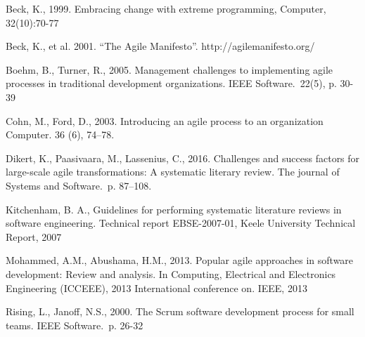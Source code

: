 \renewcommand{\baselinestretch}{1.0}
\setlength{\parskip}{0.5em}

Beck, K., 1999. Embracing change with extreme programming, Computer,
32(10):70-77

Beck, K., et al. 2001. ``The Agile Manifesto''.
http://agilemanifesto.org/

Boehm, B., Turner, R., 2005. Management challenges to implementing agile
processes in traditional development organizations. IEEE Software.\ 22(5), p. 30-39

Cohn, M., Ford, D., 2003. Introducing an agile process to an
organization Computer. 36 (6), 74–78.

Dikert, K., Paasivaara, M., Lassenius, C., 2016. Challenges and success factors
for large-scale agile transformations: A systematic literary review. The journal
of Systems and Software.\ p. 87–108.

Kitchenham, B. A., Guidelines for performing systematic literature
reviews in software engineering. Technical report EBSE-2007-01, Keele University
Technical Report, 2007

Mohammed, A.M., Abushama, H.M., 2013. Popular agile approaches in software
development: Review and analysis. In Computing, Electrical and Electronics
Engineering (ICCEEE), 2013 International conference on. IEEE, 2013

Rising, L., Janoff, N.S., 2000. The Scrum software development process for small teams. IEEE Software.\ p. 26-32
